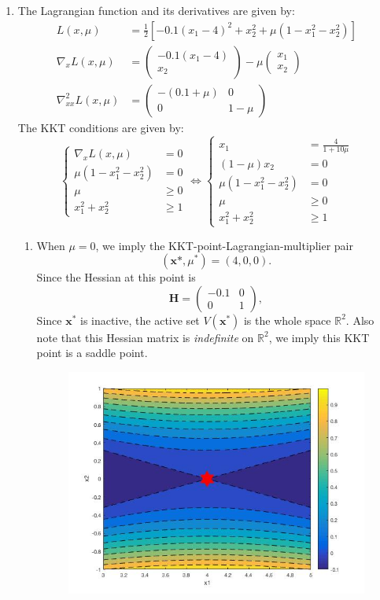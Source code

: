 \begin{enumerate}
\item
The Lagrangian function and its derivatives are given by:
\begin{subequations}
\begin{align}
L(x,\mu)&=\frac{1}{2}\left[-0.1(x_1-4)^2+x_2^2+\mu(1-x_1^2-x_2^2)\right]\\
\nabla_xL(x,\mu)&=\begin{pmatrix}
-0.1(x_1-4)\\x_2
\end{pmatrix}-\mu\begin{pmatrix}
x_1\\x_2
\end{pmatrix}\\
\nabla_{xx}^2L(x,\mu)&=\begin{pmatrix}
-(0.1+\mu)&0\\0&1-\mu
\end{pmatrix}
\end{align}
\end{subequations}
The KKT conditions are given by:
\[
\left\{
\begin{aligned}
\nabla_xL(x,\mu)&=0\\
\mu(1-x_1^2-x_2^2)&=0\\
\mu&\ge0\\
x_1^2+x_2^2&\ge1
\end{aligned}
\right.\Longleftrightarrow
\left\{
\begin{aligned}
x_1&=\frac{4}{1+10\mu}\\
(1-\mu)x_2&=0\\
\mu(1-x_1^2-x_2^2)&=0\\
\mu&\ge0\\
x_1^2+x_2^2&\ge1
\end{aligned}
\right.
\]
\begin{enumerate}
\item
When $\mu=0$, we imply the KKT-point-Lagrangian-multiplier pair
\[
(\bm x*,\mu^*)=(4,0,0).
\]
Since the Hessian at this point is
\[
\bm H=\begin{pmatrix}
-0.1&0\\0&1
\end{pmatrix},
\]
Since $\bm x^*$ is inactive, the active set $V(\bm x^*)$ is the whole space $\mathbb{R}^2$. Also note that this Hessian matrix is \emph{indefinite} on $\mathbb{R}^2$, we imply this KKT point is a saddle point.
\begin{figure}[H]
\centering
\includegraphics[width=10cm]{A_7_1}

\end{figure}
\end{enumerate}
\end{enumerate}
